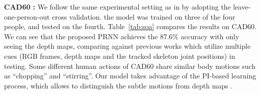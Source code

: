 \documentclass[10pt,twocolumn,letterpaper]{article}
\begin{document}
\noindent \textbf{CAD60 :} We follow the same experimental setting as in \cite{Jiang_tpami_2014,CVPR15_heterogeneous} by adopting the leave-one-person-out cross validation. \ie the model was trained on three of the four people, and tested on the fourth. Table~\ref{tab:soa} compares the results on CAD60. 
We can see that the proposed PRNN achieves the 87.6\% accuracy with only seeing the depth maps, comparing against previous works which utilize multiple cues (\ie RGB frames, depth maps and the tracked skeleton joint positions) 
in testing. Some different human actions of CAD60 share similar body motions such as ``chopping'' and ``stirring''. Our model takes advantage of the PI-based learning process, which allows to distinguish the subtle motions from depth maps \cite{Chengcheng_aaai_2014}. 
\end{document}
